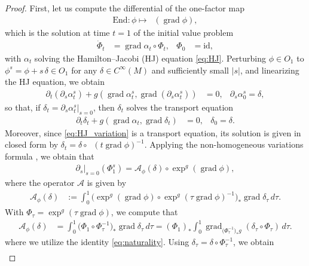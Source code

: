 \documentclass{article}
\theoremstyle{remark}
\newcommand{\M}{M}
\newcommand{\Cinf}{C^{\infty}(\M)}
\DeclareMathOperator{\grad}{\mathrm{grad}}
\DeclareMathOperator{\expg}{\mathrm{exp}^{\text{$g$}}}
\begin{document}
\begin{proof}
    First, let us compute the differential of the one-factor map
%
\begin{align*}
    \mathrm{End}:\phi\mapsto \expg(\grad \phi), %
\end{align*}
%
which is the solution at time $t=1$ of the initial value problem
%
\begin{align*}
    \dot{\Phi}_t&= \grad \alpha_t \circ \Phi_t, & \Phi_0&=\mathrm{id},
\end{align*}
%
with $\alpha_t$ solving the Hamilton--Jacobi (HJ) equation \eqref{eq:HJ}.
%
Perturbing $\phi\in O_1$ to $\phi^{s}=\phi + s\,\delta \in O_1$ for any $\delta\in\Cinf$ and sufficiently small $|s|$, and linearizing the HJ equation, we obtain
%
\begin{align*}
    \partial_t(\partial_{s}\alpha^{s}_t) + g(\grad\alpha^{s}_t,\grad(\partial_{s}\alpha^{s}_t)) &= 0, & \partial_{s}\alpha^{s}_0=\delta, %
\end{align*}
%
so that, if $\delta_t = \partial_{s}\alpha^{s}_t|_{{s} = 0}$, then $\delta_t$ solves the transport equation %
%
\begin{align}\label{eq:HJ_variation}
    \partial_t\delta_t + g(\grad\alpha_t,\grad \delta_t) &= 0, & \delta_0=\delta.
\end{align}
%
Moreover, since \eqref{eq:HJ_variation} is a transport equation, its solution is given in closed form by $\delta_t = \delta\circ \expg(t \grad \phi)^{-1}$. Applying the non-homogeneous variations formula \cite[Section 2.8]{agrachev2013control}, we obtain that
%
\begin{align*}
    \partial_{s}|_{{s}=0}(\Phi_1^{{s}}) = \mathcal{A}_{\phi}(\delta)\circ \exp^g(\grad\phi),
\end{align*}
%
where the operator $\mathcal{A}$ is given by
%
\begin{align*}
    \mathcal{A}_{\phi}(\delta)
    &:= \int_0^1 \big(\exp^g(\grad \phi)\circ\exp^g(\tau \grad \phi)^{-1}\big)_*\grad\delta_\tau \,d\tau.
\end{align*}
%
With $\Phi_\tau = \exp^g(\tau \grad \phi)$, we compute that
%
\begin{align*} %
    \mathcal{A}_{\phi}(\delta)
    &= \int_0^1 \big(\Phi_1\circ\Phi_\tau^{-1}\big)_*\grad\delta_\tau \,d\tau= (\Phi_1)_*\int_0^1 \grad_{\big(\Phi_\tau^{-1}\big)_*g}(\delta_\tau\circ\Phi_\tau) \,d\tau.
\end{align*}
%
where we utilize the identity \eqref{eq:naturality}. Using $\delta_\tau = \delta\circ \Phi_\tau^{-1}$, we obtain
%
\begin{align*}

\end{align*}
\end{proof}
\end{document}
